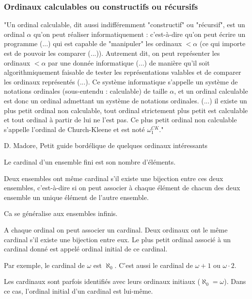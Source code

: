 \documentclass[12pt]{beamer}
\begin{document}
\begin{frame}
\frametitle{Ordinaux calculables ou constructifs ou récursifs}

\small

"Un ordinal calculable, dit aussi indifféremment "constructif" ou "récursif", est un ordinal $\alpha$ qu'on peut réaliser informatiquement : c'est-à-dire qu'on peut écrire un programme (...) qui est capable de "manipuler" les ordinaux $< \alpha$ (ce qui importe est de pouvoir les comparer (...)). Autrement dit, on peut représenter les ordinaux $< \alpha$ par une donnée informatique (...) de manière qu'il soit algorithmiquement faisable de tester les représentations valables et de comparer les ordinaux représentés (...). Ce système informatique s'appelle un système de notations ordinales (sous-entendu : calculable) de taille $\alpha$, et un ordinal calculable est donc un ordinal admettant un système de notations ordinales.
(...)  il existe un plus petit ordinal non calculable, tout ordinal strictement plus petit est calculable et tout ordinal à partir de lui ne l'est pas. Ce plus petit ordinal non calculable s'appelle l'ordinal de Church-Kleene et est noté $\omega_1^{CK}$."

\smallskip

D. Madore, Petit guide bordélique de quelques ordinaux intéressants

\end{frame}
\begin{frame}

\small

Le cardinal d'un ensemble fini est son nombre d'éléments.

Deux ensembles ont même cardinal s'il existe une bijection entre ces deux ensembles, c'est-à-dire si on peut associer à chaque élément de chacun des deux ensemble un unique élément de l'autre ensemble.

Ca se généralise aux ensembles infinis.

\end{frame}
\begin{frame}

A chaque ordinal on peut associer un cardinal. Deux ordinaux ont le même cardinal s'il existe une bijection entre eux. Le plus petit ordinal associé à un cardinal donné est appelé ordinal initial de ce cardinal.

Par exemple, le cardinal de $\omega$ est $\aleph_0$. C'est aussi le cardinal de $\omega+1$ ou $\omega \cdot 2$.

Les cardinaux sont parfois identifiés avec leurs ordinaux initiaux ($\aleph_0 = \omega$). Dans ce cas, l'ordinal initial d'un cardinal est lui-même.

\end{frame}
\end{document}

